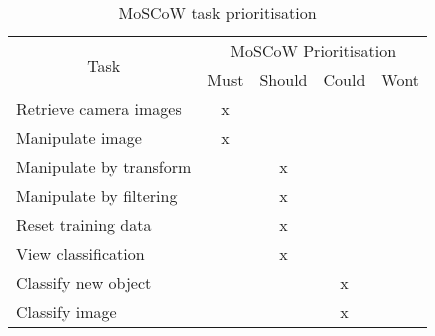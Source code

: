 \begin{table}[h]
\centering
\begin{tabular}{|l|c|c|c|c|}
\hline
\multicolumn{1}{|c|}{\multirow{2}{*}{Task}} & \multicolumn{4}{c|}{MoSCoW Prioritisation} \\ \cline{2-5} 
\multicolumn{1}{|c|}{}                      & Must     & Should     & Could    & Wont    \\ \hline
Retrieve camera images                      & x        &            &          &         \\ \cline{1-1}
Manipulate image                            & x        &            &          &         \\ \cline{1-1}
Manipulate by transform                     &          & x          &          &         \\ \cline{1-1}
Manipulate by filtering                     &          & x          &          &         \\ \cline{1-1}
Reset training data                         &          & x          &          &         \\ \cline{1-1}
View classification                         &          & x          &          &         \\ \cline{1-1}
Classify new object                         &          &            & x        &         \\ \cline{1-1}
Classify image                              &          &            & x        &         \\ \hline
\end{tabular}
\caption{MoSCoW task prioritisation\protect {\label{tab:moscow_table}}}
\end{table}

